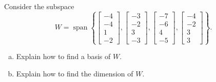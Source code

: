 
\begin{exerciseStatement}


Consider the subspace \[W=\operatorname{span}  \left\{ \left[\begin{array}{c}
-4 \\
-4 \\
1 \\
-2
\end{array}\right] , \left[\begin{array}{c}
-3 \\
-2 \\
3 \\
-3
\end{array}\right] , \left[\begin{array}{c}
-7 \\
-6 \\
4 \\
-5
\end{array}\right] , \left[\begin{array}{c}
-4 \\
-2 \\
3 \\
3
\end{array}\right] \right\} .\]


\begin{enumerate}[(a)]
\item  Explain how to find a basis of \(W\).
\item  Explain how to find the dimension of \(W\).
\end{enumerate}
    
\end{exerciseStatement}
    
